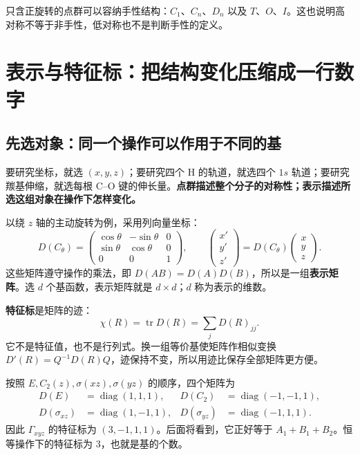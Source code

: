 只含正旋转的点群可以容纳手性结构：$C_1$、$C_n$、$D_n$ 以及 $T$、$O$、$I$。这也说明高对称不等于非手性，低对称也不是判断手性的定义。

\section{表示与特征标：把结构变化压缩成一行数字}
\label{sec:characters}

\subsection{先选对象：同一个操作可以作用于不同的基}
要研究坐标，就选 $(x,y,z)$；要研究四个 H 的轨道，就选四个 $1s$ 轨道；要研究羰基伸缩，就选每根 C--O 键的伸长量。\textbf{点群描述整个分子的对称性；表示描述所选这组对象在操作下怎样变化。}

以绕 $z$ 轴的主动旋转为例，采用列向量坐标：
\[
 D(C_\theta)=
 \begin{pmatrix}
 \cos\theta&-\sin\theta&0\\
 \sin\theta&\cos\theta&0\\
 0&0&1
 \end{pmatrix},\qquad
 \begin{pmatrix}x'\\y'\\z'\end{pmatrix}
 =D(C_\theta)\begin{pmatrix}x\\y\\z\end{pmatrix}.
\]
这些矩阵遵守操作的乘法，即 $D(AB)=D(A)D(B)$，所以是一组\textbf{表示矩阵}。选 $d$ 个基函数，表示矩阵就是 $d\times d$；$d$ 称为表示的维数。

\textbf{特征标}是矩阵的迹：
\[
 \boxed{\chi(R)=\operatorname{tr}D(R)=\sum_jD(R)_{jj}}.
\]
它不是特征值，也不是行列式。换一组等价基使矩阵作相似变换 $D'(R)=Q^{-1}D(R)Q$，迹保持不变，所以用迹比保存全部矩阵更方便。

\begin{worked}
按照 $E,C_2(z),\sigma(xz),\sigma(yz)$ 的顺序，四个矩阵为
\begin{align*}
D(E)&=\operatorname{diag}(1,1,1), &
D(C_2)&=\operatorname{diag}(-1,-1,1),\\
D(\sigma_{xz})&=\operatorname{diag}(1,-1,1), &
D(\sigma_{yz})&=\operatorname{diag}(-1,1,1).
\end{align*}
因此 $\Gamma_{xyz}$ 的特征标为 $(3,-1,1,1)$。后面将看到，它正好等于 $A_1+B_1+B_2$。恒等操作下的特征标为 $3$，也就是基的个数。
\end{worked}

